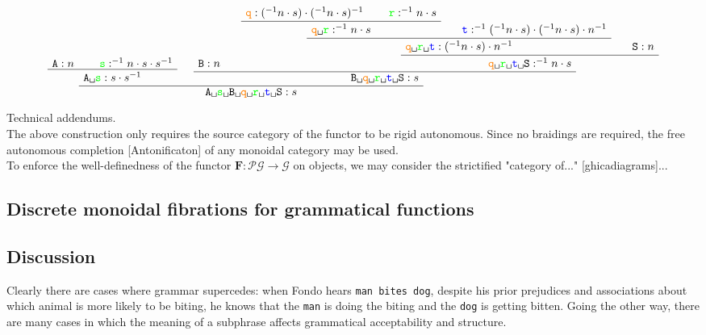 \[
\AxiomC{$\texttt{A} : n$}
\AxiomC{$\textcolor{green}{\texttt{s}} : ^{-1}n \cdot s \cdot s^{-1}$}
\BinaryInfC{$\texttt{A\textvisiblespace \textcolor{green}{s}} : s \cdot s^{-1}$}
\AxiomC{$\texttt{B} : n$}
\AxiomC{$\textcolor{orange}{\texttt{q}} :  (^{-1}n \cdot s) \cdot ( ^{-1}n \cdot s)^{-1} $}
\AxiomC{$\textcolor{green}{\texttt{r}} : ^{-1}n \cdot s$}
\BinaryInfC{$\texttt{\textcolor{orange}{q}\textvisiblespace \textcolor{green}{r}} : ^{-1}n \cdot s$}
\AxiomC{$\textcolor{blue}{\texttt{t}} : ^{-1}( ^{-1}n \cdot s) \cdot ( ^{-1}n \cdot s) \cdot n^{-1}$}
\BinaryInfC{$\texttt{\textcolor{orange}{q}\textvisiblespace \textcolor{green}{r}\textvisiblespace \textcolor{blue}{t}} : (^{-1}n \cdot s) \cdot n^{-1}$}
\AxiomC{$\texttt{S} : n$}
\BinaryInfC{$\texttt{\textcolor{orange}{q}\textvisiblespace \textcolor{green}{r}\textvisiblespace \textcolor{blue}{t}\textvisiblespace S} : ^{-1}n \cdot s$}
\BinaryInfC{$\texttt{B\textvisiblespace \textcolor{orange}{q}\textvisiblespace \textcolor{green}{r}\textvisiblespace \textcolor{blue}{t}\textvisiblespace S} : s$}
\BinaryInfC{$\texttt{A\textvisiblespace \textcolor{green}{s}\textvisiblespace B\textvisiblespace \textcolor{orange}{q}\textvisiblespace \textcolor{green}{r}\textvisiblespace \textcolor{blue}{t}\textvisiblespace S} : s$}
\DisplayProof
\]

\begin{remark}
Technical addendums.\\
The above construction only requires the source category of the functor to be rigid autonomous. Since no braidings are required, the free autonomous completion [Antonificaton] of any monoidal category may be used.\\
To enforce the well-definedness of the functor $\mathbf{F}: \mathcal{P}\mathcal{G} \rightarrow \mathcal{G}$ on objects, we may consider the strictified "category of..." [ghicadiagrams]...
\end{remark}

\subsection{Discrete monoidal fibrations for grammatical functions}

\subsection{Discussion}

 Clearly there are cases where grammar supercedes: when Fondo hears \texttt{man bites dog}, despite his prior prejudices and associations about which animal is more likely to be biting, he knows that the \texttt{man} is doing the biting and the \texttt{dog} is getting bitten. Going the other way, there are many cases in which the meaning of a subphrase affects grammatical acceptability and structure.

